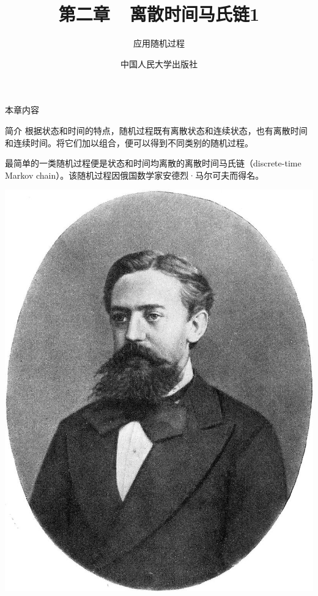 \documentclass[t]{beamer}
\begin{document}
\fontsize{11}{18}\selectfont


\CTEXindent



  \title{第二章~~离散时间马氏链1}
\author{应用随机过程}
\date{中国人民大学出版社}
  \begin{frame}
    \maketitle
  \end{frame}

\begin{frame}{本章内容}
  \begin{multicols}{2}
    \tableofcontents
  \end{multicols}
\end{frame}

\begin{frame}{简介}
    根据状态和时间的特点，随机过程既有离散状态和连续状态，也有离散时间和连续时间。将它们加以组合，便可以得到不同类别的随机过程。

    最简单的一类随机过程便是状态和时间均离散的离散时间马氏链（discrete-time Markov chain）。该随机过程因俄国数学家安德烈·马尔可夫而得名。
    \begin{center}
        \includegraphics[height=.38\textheight]{fig/markov.jpg}
    \end{center}
\end{frame}
\end{document}
